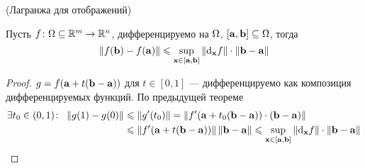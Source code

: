 \begin{theorem}(Лагранжа для отображений)

    Пусть $f \colon \O \subseteq \Rm \to \Rn$, дифференцируемо на $\O$,
    $[\ea, \eb] \subseteq \O$, тогда
\[
    \norm{f(\eb) - f(\ea)} \leqslant \sup_{\x \in [\ea,
    \eb]}{\norm{\der{f}{\x}}} \cdot \norm{\eb - \ea}
\]
\end{theorem}
\begin{proof}

    $g = f(\ea + t(\eb - \ea))$ для $t \in [0, 1]$ --- дифференцируемо как
    композиция дифференцируемых функций. По предыдущей теореме
\begin{align*}
    \exists t_0 \in (0, 1)\colon~ \norm{g(1) - g(0)} &\leqslant \norm{g'(t_0)}
    = \norm{f'(\ea + t_0(\eb - \ea)) \cdot (\eb - \ea)} \\
    &\leqslant \norm{f'(\ea + t(\eb - \ea))}
    \norm{\eb - \ea} \leqslant \sup_{\x \in [\ea,
    \eb]}{\norm{\der{f}{\x}}} \cdot \norm{\eb - \ea}
\end{align*}
\end{proof}
